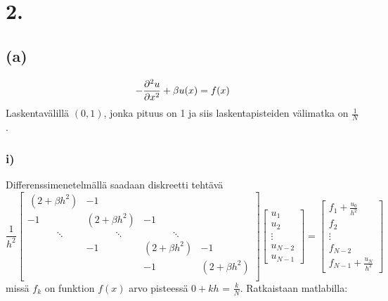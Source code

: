 \documentclass{article}
\begin{document}
\newpage

\section*{2.}

\subsection*{(a)}

\[
  -\frac{\partial^2 u}{\partial x^2} + \beta u(x) = f(x) \\
\]
Laskentavälillä $(0, 1)$, jonka pituus on 1 ja siis laskentapisteiden välimatka
on $\frac{1}{N}$.

\subsubsection*{i)}

Differenssimenetelmällä saadaan diskreetti tehtävä
\[
  \frac{1}{h^2}
  \begin{bmatrix}
    \,(2 + \beta h^2) & -1 && \,\\
     -1 & (2 + \beta h^2) & -1 & \\
      \qquad \quad \ddots &  \qquad \quad \ddots & \qquad \quad \ddots & \\
     & -1 & (2 + \beta h^2) & -1  \\
     & & -1 & (2 + \beta h^2) \\
  \end{bmatrix}
  \begin{bmatrix}
    u_1 \\ u_2 \\ \vdots \\ u_{N-2} \\ u_{N-1}
  \end{bmatrix}
  =
  \begin{bmatrix}
    f_1 + \frac{u_0}{h^2} \\ f_2 \\ \vdots \\ f_{N-2} \\ f_{N-1} + \frac{u_N}{h^2}
  \end{bmatrix}
\]
missä $f_k$ on funktion $f(x)$ arvo pisteessä $0 + kh$ = $\frac{k}{N}$.
Ratkaistaan matlabilla:
\end{document}
